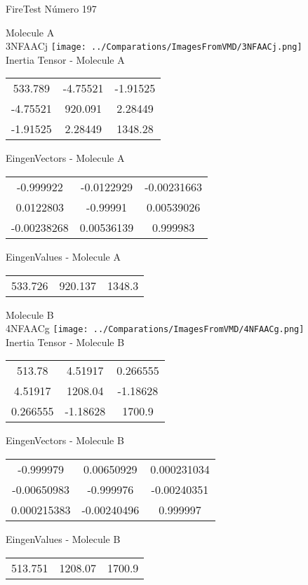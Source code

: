\vtab[-2cm]
\begin{center}
{\large FireTest \tab Número 197}
\end{center}
\begin{multicols}{2}
\begin{center}

Molecule A \\ 
3NFAACj
\texttt{[image: ../Comparations/ImagesFromVMD/3NFAACj.png]}
\\
Inertia Tensor - Molecule A \\
\vtab

\begin{tabular}{|c c c|}
533.789	 & 	-4.75521	 & 	-1.91525	 \\
-4.75521	 & 	920.091	 & 	2.28449	 \\
-1.91525	 & 	2.28449	 & 	1348.28
\end{tabular}

\vtab
 EingenVectors - Molecule A     \\
\vtab
\begin{tabular}{|c c c|}
-0.999922	 & 	-0.0122929	 & 	-0.00231663	 \\
0.0122803	 & 	-0.99991	 & 	0.00539026	 \\
-0.00238268	 & 	0.00536139	 & 	0.999983
\end{tabular}

\vtab
 EingenValues - Molecule A     \\
\vtab
\begin{tabular}{|c c c|}
533.726	 & 	920.137	 & 	1348.3	 \\
\end{tabular}
\columnbreak

Molecule B \\ 
4NFAACg
\texttt{[image: ../Comparations/ImagesFromVMD/4NFAACg.png]}
\\
Inertia Tensor - Molecule B \\
\vtab

\begin{tabular}{|c c c|}
513.78	 & 	4.51917	 & 	0.266555	 \\
4.51917	 & 	1208.04	 & 	-1.18628	 \\
0.266555	 & 	-1.18628	 & 	1700.9
\end{tabular}

\vtab
 EingenVectors - Molecule B     \\
\vtab
\begin{tabular}{|c c c|}
-0.999979	 & 	0.00650929	 & 	0.000231034	 \\
-0.00650983	 & 	-0.999976	 & 	-0.00240351	 \\
0.000215383	 & 	-0.00240496	 & 	0.999997
\end{tabular}

\vtab
 EingenValues - Molecule B     \\
\vtab
\begin{tabular}{|c c c|}
513.751	 & 	1208.07	 & 	1700.9	 \\
\end{tabular}

\end{center}
\end{multicols}
